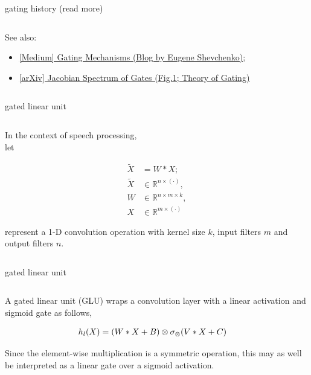 \documentclass[aspectratio=169,xcolor={dvipsnames,svgnames}]{beamer}
\begin{document}
\begin{frame}[label={sec:org61537dc}]{gating history (read more)}
\begin{columns}
\begin{column}{0.45\columnwidth}
\alert{See also:}
\begin{itemize}
\item \href{https://medium.com/@eugenesh4work/gating-mechanisms-in-neural-networks-dc83a0bdb8c3}{[Medium] Gating Mechanisms (Blog by Eugene
Shevchenko)};
\item \href{https://arxiv.org/abs/2007.14823}{[arXiv] Jacobian Spectrum of Gates (Fig.1; Theory of
Gating)}
\end{itemize}
\end{column}
\end{columns}
\end{frame}

\begin{frame}[label={sec:gated-linear-unit}]{gated linear unit}
\begin{columns}
\begin{column}{0.45\columnwidth}
In the context of speech processing, \\[0pt]
let

\begin{align*}
\tilde{X}&=W*X; \\
\tilde{X}&\in\mathbb{R}^{n\times(\cdot)}, \\
W&\in\mathbb{R}^{n\times m\times k}, \\
X&\in\mathbb{R}^{m\times(\cdot)}
\end{align*}

represent a 1-D convolution operation with kernel size
\(k\), input filters \(m\) and output filters \(n\).
\end{column}
\end{columns}
\end{frame}

\begin{frame}[label={sec:orgd16daa6}]{gated linear unit}
\begin{columns}
\begin{column}{0.45\columnwidth}
A gated linear unit (GLU) wraps a convolution layer
with a linear activation and sigmoid gate as follows,

\begin{align}
  \notag
  h_l(X) &= (W*X+B) \otimes \sigma_{\otimes} (V*X+C)
\end{align}

Since the element-wise multiplication is a symmetric
operation, this may as well be interpreted as a linear
gate over a sigmoid activation.
\end{column}
\end{columns}
\end{frame}
\end{document}
